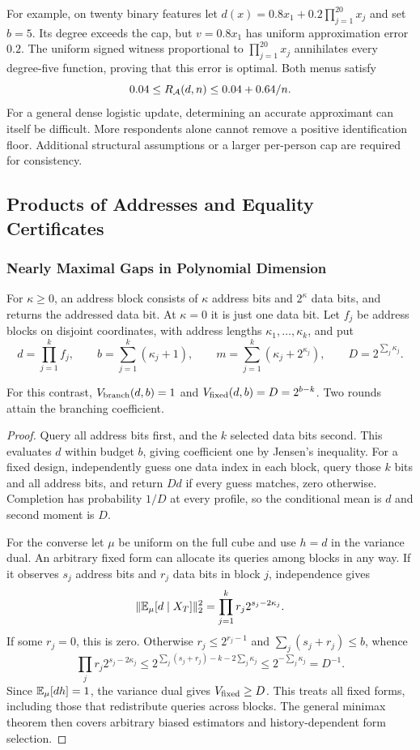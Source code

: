 For example, on twenty binary features let $d(x)=0.8x_1+0.2\prod_{j=1}^{20}x_j$ and set $b=5$. Its degree exceeds the cap, but $v=0.8x_1$ has uniform approximation error $0.2$. The uniform signed witness proportional to $\prod_{j=1}^{20}x_j$ annihilates every degree-five function, proving that this error is optimal. Both menus satisfy
\[
 0.04\le R_\mathcal A(d,n)\le0.04+0.64/n.
\]
For a general dense logistic update, determining an accurate approximant can itself be difficult. More respondents alone cannot remove a positive identification floor. Additional structural assumptions or a larger per-person cap are required for consistency.

\subsection{Products of Addresses and Equality Certificates}\label{app:structure}
\subsubsection{Nearly Maximal Gaps in Polynomial Dimension}\label{app:productaddress}
For $\kappa\ge0$, an address block consists of $\kappa$ address bits and $2^\kappa$ data bits, and returns the addressed data bit. At $\kappa=0$ it is just one data bit. Let $f_j$ be address blocks on disjoint coordinates, with address lengths $\kappa_1,\ldots,\kappa_k$, and put
\[
 d=\prod_{j=1}^k f_j,\qquad
 b=\sum_{j=1}^k(\kappa_j+1),\qquad
 m=\sum_{j=1}^k(\kappa_j+2^{\kappa_j}),\qquad D=2^{\sum_j \kappa_j}.
\]
\begin{proposition}\label{prop:productaddress}
For this contrast, $V_{\rm branch}(d,b)=1$ and $V_{\rm fixed}(d,b)=D=2^{b-k}$. Two rounds attain the branching coefficient.
\end{proposition}
\begin{proof}
Query all address bits first, and the $k$ selected data bits second. This evaluates $d$ within budget $b$, giving coefficient one by Jensen's inequality. For a fixed design, independently guess one data index in each block, query those $k$ bits and all address bits, and return $D d$ if every guess matches, zero otherwise. Completion has probability $1/D$ at every profile, so the conditional mean is $d$ and second moment is $D$.

For the converse let $\mu$ be uniform on the full cube and use $h=d$ in the variance dual. An arbitrary fixed form can allocate its queries among blocks in any way. If it observes $s_j$ address bits and $r_j$ data bits in block $j$, independence gives
\[
 \|\mathbb{E}_\mu[d\mid X_T]\|_2^2
 =\prod_{j=1}^k r_j2^{s_j-2\kappa_j}.
\]
If some $r_j=0$, this is zero. Otherwise $r_j\le2^{r_j-1}$ and $\sum_j(s_j+r_j)\le b$, whence
\[
 \prod_j r_j2^{s_j-2\kappa_j}
 \le 2^{\sum_j(s_j+r_j)-k-2\sum_j \kappa_j}
 \le 2^{-\sum_j \kappa_j}=D^{-1}.
\]
Since $\mathbb{E}_\mu[dh]=1$, the variance dual gives $V_{\rm fixed}\ge D$. This treats all fixed forms, including those that redistribute queries across blocks. The general minimax theorem then covers arbitrary biased estimators and history-dependent form selection.
\end{proof}

